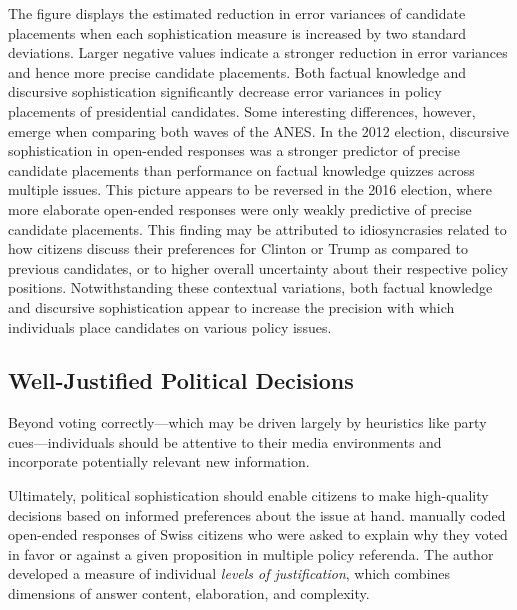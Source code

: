 The figure displays the estimated reduction in error variances of candidate placements when each sophistication measure is increased by two standard deviations. Larger negative values indicate a stronger reduction in error variances and hence more precise candidate placements. Both factual knowledge and discursive sophistication significantly decrease error variances in policy placements of presidential candidates. Some interesting differences, however, emerge when comparing both waves of the ANES. In the 2012 election, discursive sophistication in open-ended responses was a stronger predictor of precise candidate placements than performance on factual knowledge quizzes across multiple issues. This picture appears to be reversed in the 2016 election, where more elaborate open-ended responses were only weakly predictive of precise candidate placements. This finding may be attributed to idiosyncrasies related to how citizens discuss their preferences for Clinton or Trump as compared to previous candidates, or to higher overall uncertainty about their respective policy positions. Notwithstanding these contextual variations, both factual knowledge and discursive sophistication appear to increase the precision with which individuals place candidates on various policy issues.


\subsection{Well-Justified Political Decisions}

Beyond voting correctly---which may be driven largely by heuristics like party cues---individuals should be attentive to their media environments and incorporate potentially relevant new information.

Ultimately, political sophistication should enable citizens to make high-quality decisions based on informed preferences about the issue at hand. \citet{colombo2016justifications} manually coded open-ended responses of Swiss citizens who were asked to explain why they voted in favor or against a given proposition in multiple policy referenda. The author developed a measure of individual \textit{levels of justification}, which combines dimensions of answer content, elaboration, and complexity.

